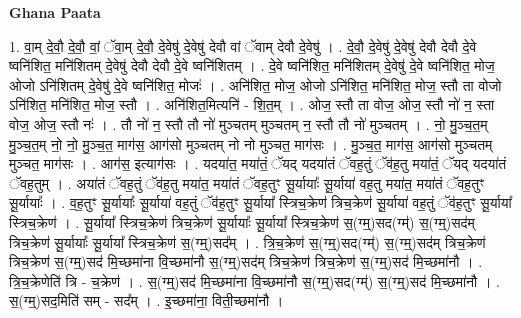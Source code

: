 \documentclass[17pt]{extarticle}
\begin{document}
\textbf{Ghana Paata } \newline

1. वा॒म् दे॒वौ॒ दे॒वौ॒ वां॒ ॅवा॒म् दे॒वौ॒ दे॒वेषु॑ दे॒वेषु॑ देवौ वां ॅवाम् देवौ दे॒वेषु॑ । . दे॒वौ॒ दे॒वेषु॑ दे॒वेषु॑ देवौ देवौ दे॒वे ष्वनि॑शित॒ मनि॑शितम् दे॒वेषु॑ देवौ देवौ दे॒वे ष्वनि॑शितम् । . दे॒वे ष्वनि॑शित॒ मनि॑शितम् दे॒वेषु॑ दे॒वे ष्वनि॑शित॒ मोज॒ ओजो ऽनि॑शितम् दे॒वेषु॑ दे॒वे ष्वनि॑शित॒ मोजः॑ । . अनि॑शित॒ मोज॒ ओजो ऽनि॑शित॒ मनि॑शित॒ मोज॒ स्तौ ता वोजो ऽनि॑शित॒ मनि॑शित॒ मोज॒ स्तौ । . अनि॑शित॒मित्यनि॑ - शि॒त॒म् । . ओज॒ स्तौ ता वोज॒ ओज॒ स्तौ नो॑ न॒ स्ता वोज॒ ओज॒ स्तौ नः॑ । . तौ नो॑ न॒ स्तौ तौ नो॑ मुञ्चतम् मुञ्चतम् न॒ स्तौ तौ नो॑ मुञ्चतम् । . नो॒ मु॒ञ्च॒त॒म् मु॒ञ्च॒त॒म् नो॒ नो॒ मु॒ञ्च॒त॒ माग॑स॒ आग॑सो मुञ्चतम् नो नो मुञ्चत॒ माग॑सः । . मु॒ञ्च॒त॒ माग॑स॒ आग॑सो मुञ्चतम् मुञ्चत॒ माग॑सः । . आग॑स॒ इत्याग॑सः । . यदया॑त॒ मया॑तं॒ ॅयद् यदया॑तं ॅवह॒तुं ॅव॑ह॒तु मया॑तं॒ ॅयद् यदया॑तं ॅवह॒तुम् । . अया॑तं ॅवह॒तुं ॅव॑ह॒तु मया॑त॒ मया॑तं ॅवह॒तुꣳ सू॒र्यायाः᳚ सू॒र्याया॑ वह॒तु मया॑त॒ मया॑तं ॅवह॒तुꣳ सू॒र्यायाः᳚ । . व॒ह॒तुꣳ सू॒र्यायाः᳚ सू॒र्याया॑ वह॒तुं ॅव॑ह॒तुꣳ सू॒र्याया᳚ स्त्रिच॒क्रेण॑ त्रिच॒क्रेण॑ सू॒र्याया॑ वह॒तुं ॅव॑ह॒तुꣳ सू॒र्याया᳚ स्त्रिच॒क्रेण॑ । . सू॒र्याया᳚ स्त्रिच॒क्रेण॑ त्रिच॒क्रेण॑ सू॒र्यायाः᳚ सू॒र्याया᳚ स्त्रिच॒क्रेण॑ स॒(ग्म्॒)सद(ग्म्॑) स॒(ग्म्॒)सद॑म् त्रिच॒क्रेण॑ सू॒र्यायाः᳚ सू॒र्याया᳚ स्त्रिच॒क्रेण॑ स॒(ग्म्॒)सद᳚म् । . त्रि॒च॒क्रेण॑ स॒(ग्म्॒)सद(ग्म्॑) स॒(ग्म्॒)सद॑म् त्रिच॒क्रेण॑ त्रिच॒क्रेण॑ स॒(ग्म्॒)सद॑ मि॒च्छमा॑ना वि॒च्छमा॑नौ स॒(ग्म्॒)सद॑म् त्रिच॒क्रेण॑ त्रिच॒क्रेण॑ स॒(ग्म्॒)सद॑ मि॒च्छमा॑नौ । . त्रि॒च॒क्रेणेति॑ त्रि - च॒क्रेण॑ । . स॒(ग्म्॒)सद॑ मि॒च्छमा॑ना वि॒च्छमा॑नौ स॒(ग्म्॒)सद(ग्म्॑) स॒(ग्म्॒)सद॑ मि॒च्छमा॑नौ । . स॒(ग्म्॒)सद॒मिति॑ सम् - सद᳚म् । . इ॒च्छमा॑ना॒ विती॒च्छमा॑नौ । \newline
\end{document}
